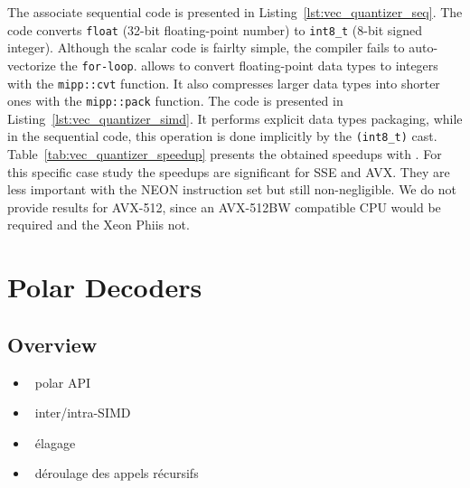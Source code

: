The associate sequential code is presented in
Listing~\ref{lst:vec_quantizer_seq}. The code converts \verb|float| (32-bit
floating-point number) to \verb|int8_t| (8-bit signed integer). Although the
scalar code is fairlty simple, the compiler fails to auto-vectorize the
\verb|for-loop|. \MIPP allows to convert floating-point data types to integers
with the \verb|mipp::cvt| function. It also compresses larger data types into
shorter ones with the \verb|mipp::pack| function. The \MIPP code is presented in
Listing~\ref{lst:vec_quantizer_simd}. It performs explicit data types packaging,
while in the sequential code, this operation is done implicitly by the
\verb|(int8_t)| cast. Table~\ref{tab:vec_quantizer_speedup} presents the
obtained speedups with \MIPP. For this specific case study the speedups are
significant for SSE and AVX. They are less important with the NEON instruction
set but still non-negligible. We do not provide results for AVX-512, since an
AVX-512BW compatible CPU would be required and the Xeon Phi\TM is not.

\section{Polar Decoders}
\label{sec:vec_polar}

\subsection{Overview}

\begin{itemize}
  \item \cmark~polar API
  \item \cmark~inter/intra-SIMD
  \item \cmark~élagage
  \item \cmark~déroulage des appels récursifs
\end{itemize}

